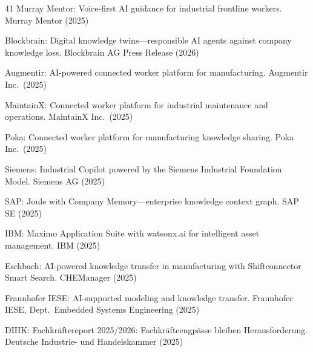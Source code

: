 \documentclass[]{ceurart}
\begin{document}
\begin{thebibliography}{41}
 Murray Mentor: Voice-first AI guidance for
  industrial frontline workers. Murray Mentor (2025)

 Blockbrain: Digital knowledge twins---responsible
  AI agents against company knowledge loss. Blockbrain AG Press Release
  (2026)

 Augmentir: AI-powered connected worker platform
  for manufacturing. Augmentir Inc.\ (2025)

 MaintainX: Connected worker platform for
  industrial maintenance and operations. MaintainX Inc.\ (2025)

 Poka: Connected worker platform for manufacturing
  knowledge sharing. Poka Inc.\ (2025)

 Siemens: Industrial Copilot powered by the
  Siemens Industrial Foundation Model. Siemens AG (2025)

 SAP: Joule with Company
  Memory---enterprise knowledge context graph. SAP SE (2025)

 IBM: Maximo Application Suite with watsonx.ai
  for intelligent asset management. IBM (2025)

 Eschbach: AI-powered knowledge transfer in
  manufacturing with Shiftconnector Smart Search. CHEManager (2025)

 Fraunhofer IESE: AI-supported modeling and
  knowledge transfer. Fraunhofer IESE, Dept.\ Embedded Systems
  Engineering (2025)

 DIHK: Fachkr\"aftereport 2025/2026:
  Fachkr\"afteengp\"asse bleiben Herausforderung. Deutsche Industrie-
  und Handelskammer (2025)

\end{thebibliography}
\end{document}

